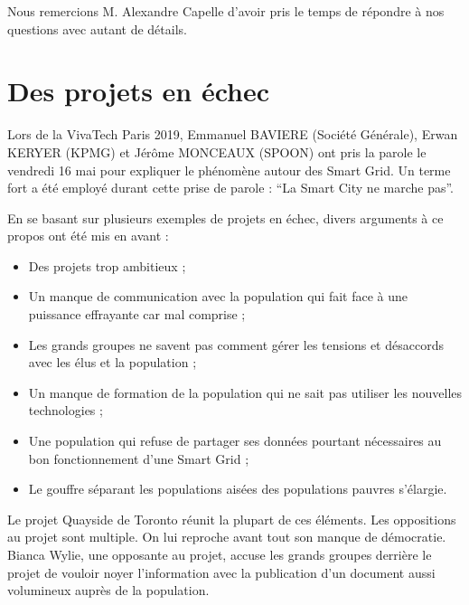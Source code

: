 Nous remercions M. Alexandre Capelle d'avoir pris le temps de répondre à nos questions avec autant de détails.

\section{Des projets en échec}

Lors de la VivaTech Paris 2019, Emmanuel BAVIERE (Société Générale), Erwan KERYER (KPMG)
et Jérôme MONCEAUX (SPOON) ont pris la parole le vendredi 16 mai pour expliquer le phénomène autour des
Smart Grid. Un terme fort a été employé durant cette prise de parole :
``La Smart City ne marche pas''.

En se basant sur plusieurs exemples de projets en échec, divers arguments à ce propos ont été mis en
avant :
\begin{itemize}
    \item Des projets trop ambitieux ;
    \item Un manque de communication avec la population qui fait face à une puissance effrayante car mal comprise ;
    \item Les grands groupes ne savent pas comment gérer les tensions et désaccords avec les élus et la population ;
    \item Un manque de formation de la population qui ne sait pas utiliser les nouvelles technologies ;
    \item Une population qui refuse de partager ses données pourtant nécessaires au bon fonctionnement d’une Smart Grid ;
    \item Le gouffre séparant les populations aisées des populations pauvres s'élargie.
\end{itemize}

Le projet Quayside de Toronto réunit la plupart de ces éléments.
Les oppositions au projet sont multiple. On lui reproche avant tout son manque de démocratie.
Bianca Wylie, une opposante au projet, accuse les grands groupes derrière le projet de vouloir noyer l'information
avec la publication d'un document aussi volumineux auprès de la population.